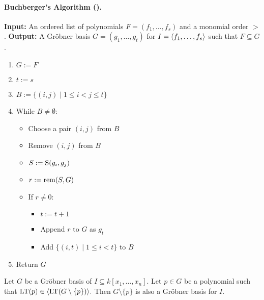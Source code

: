 \begin{htmlonly}
    \paragraph{Buchberger's Algorithm ().}
    \textbf{Input:} An ordered list of polynomials $F = (f_1, \dots, f_s)$ and a monomial order $>$.  
    \textbf{Output:} A Gröbner basis $G = (g_1, \dots, g_t)$ for $I = \langle f_1, \dots, f_s \rangle$ such that $F \subseteq G$.
    
    \begin{enumerate}
      \item $G := F$
      \item $t := s$
      \item $B := \{(i, j) \mid 1 \le i < j \le t\}$
      \item While $B \neq \emptyset$:
      \begin{itemize}
        \item Choose a pair $(i, j)$ from $B$
        \item Remove $(i, j)$ from $B$
        \item $S := \operatorname{S}(g_i, g_j)$
        \item $r := \operatorname{rem}(S, G)$
        \item If $r \neq 0$:
        \begin{itemize}
          \item $t := t + 1$
          \item Append $r$ to $G$ as $g_t$
          \item Add $\{(i, t) \mid 1 \le i < t\}$ to $B$
        \end{itemize}
      \end{itemize}
      \item Return $G$
    \end{enumerate}
\end{htmlonly}

\begin{lemma}\label{lem:grobner_basis_remove_redundant} %
    Let $G$ be a Gr{\"o}bner basis of $I \subseteq k[x_1, \ldots, x_n]$.  
    Let $p \in G$ be a polynomial such that $\operatorname{LT}(p) \in \langle \operatorname{LT}(G \setminus \{p\}) \rangle.$  
    Then $G \setminus \{p\}$ is also a Gr{\"o}bner basis for $I$.
\end{lemma}
    